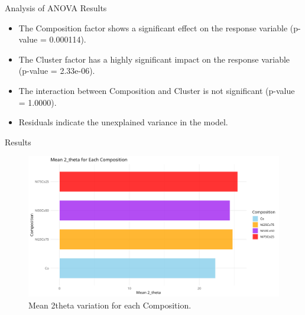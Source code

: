 \documentclass[aspectratio=169]{beamer}
\begin{document}
\begin{frame}[fragile]{Analysis of ANOVA Results}
  \begin{itemize}
    \item The Composition factor shows a significant effect on the response variable (p-value = 0.000114).
    \item The Cluster factor has a highly significant impact on the response variable (p-value = 2.33e-06).
    \item The interaction between Composition and Cluster is not significant (p-value = 1.0000).
    \item Residuals indicate the unexplained variance in the model.
  \end{itemize}
\end{frame}

\begin{frame}[fragile]{Results}
\begin{figure}
        \includegraphics[width=1\textwidth]{../plot/mean_theta.png}
        \caption{Mean 2theta variation for each Composition.}
    \end{figure}
  \end{frame}
\end{document}
